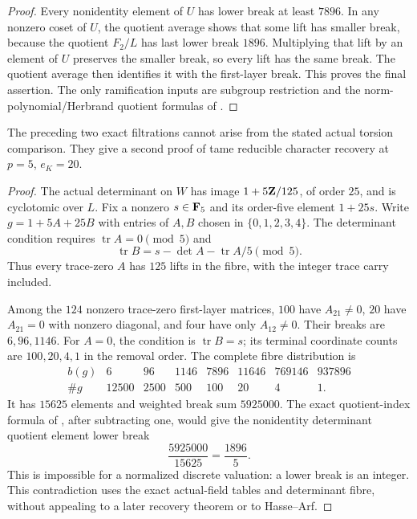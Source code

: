 \begin{proof}
Every nonidentity element of $U$ has lower break at least $7896$. In any nonzero coset of $U$, the quotient average shows that some lift has smaller break, because the quotient $F_2/L$ has last lower break $1896$. Multiplying that lift by an element of $U$ preserves the smaller break, so every lift has the same break. The quotient average then identifies it with the first-layer break. This proves the final assertion. The only ramification inputs are subgroup restriction and the norm-polynomial/Herbrand quotient formulas of \citet[Proposition~3.7, Theorem~3.10 and Proposition~3.13(ii), pp.~14--16]{ColmezLocal}.
\end{proof}

\begin{corollary}\label{cor:determinant-fibre-obstruction}
The preceding two exact filtrations cannot arise from the stated actual torsion comparison. They give a second proof of tame reducible character recovery at $p=5$, $e_K=20$.
\end{corollary}
\begin{proof}
The actual determinant on $W$ has image $1+5\mathbf Z/125$, of order $25$, and is cyclotomic over $L$. Fix a nonzero $s\in\mathbf F_5$ and its order-five element $1+25s$. Write $g=1+5A+25B$ with entries of $A,B$ chosen in $\{0,1,2,3,4\}$. The determinant condition requires $\operatorname{tr}A=0\pmod5$ and
\[
 \operatorname{tr}B=s-\det A-\operatorname{tr}A/5\pmod5.
\]
Thus every trace-zero $A$ has $125$ lifts in the fibre, with the integer trace carry included.

Among the $124$ nonzero trace-zero first-layer matrices, $100$ have $A_{21}\ne0$, $20$ have $A_{21}=0$ with nonzero diagonal, and four have only $A_{12}\ne0$. Their breaks are $6,96,1146$. For $A=0$, the condition is $\operatorname{tr}B=s$; its terminal coordinate counts are $100,20,4,1$ in the removal order. The complete fibre distribution is
\[
\begin{array}{c|rrrrrrr}
 b(g)&6&96&1146&7896&11646&769146&937896\\\hline
 \#g&12500&2500&500&100&20&4&1.
\end{array}
\]
It has $15625$ elements and weighted break sum $5925000$. The exact quotient-index formula of \citet[Proposition~3.7, pp.~14--15]{ColmezLocal}, after subtracting one, would give the nonidentity determinant quotient element lower break
\[
                  \frac{5925000}{15625}=\frac{1896}{5}.
\]
This is impossible for a normalized discrete valuation: a lower break is an integer. This contradiction uses the exact actual-field tables and determinant fibre, without appealing to a later recovery theorem or to Hasse--Arf.
\end{proof}


